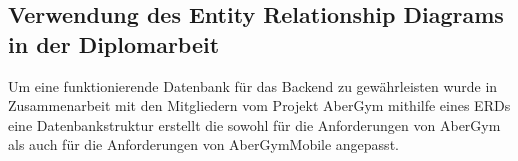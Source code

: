         \pagebreak

    \subsection{Verwendung des Entity Relationship Diagrams in der Diplomarbeit}

    Um eine funktionierende Datenbank für das Backend zu gewährleisten wurde in Zusammenarbeit mit den Mitgliedern vom Projekt AberGym  mithilfe eines ERDs eine Datenbankstruktur erstellt die sowohl für die Anforderungen von AberGym als auch für die Anforderungen von AberGymMobile angepasst.